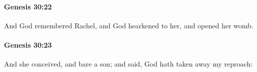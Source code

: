 		\paragraph{Genesis 30:22} %
			\label{GENESIS-30-22}

			And God remembered Rachel, and God hearkened to her, and opened her womb.


		\paragraph{Genesis 30:23} %
			\label{GENESIS-30-23}

			And she conceived, and bare a son; and said, God hath taken away my reproach:


